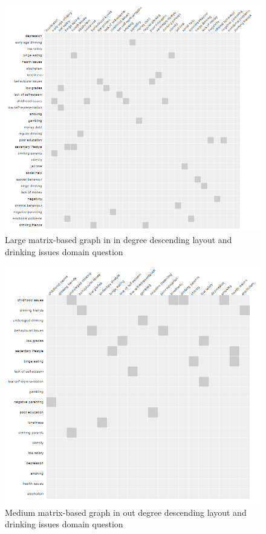 \documentclass{l4proj}
\begin{document}
\begin{appendices}
\begin{figure}[H]
\centering
\includegraphics[width=16cm]{images/drinkingLargeInDD.PNG}
\caption{Large matrix-based graph in in degree descending layout and drinking issues domain question}
\label{drinkingLargeInDD}
\end{figure}


\begin{figure}[H]
\centering
\includegraphics[width=16cm]{images/drinkingMedOutDD.PNG}
\caption{Medium matrix-based graph in out degree descending layout and drinking issues domain question}
\label{drinkingMedOutDD}
\end{figure}


\end{appendices}
\end{document}
